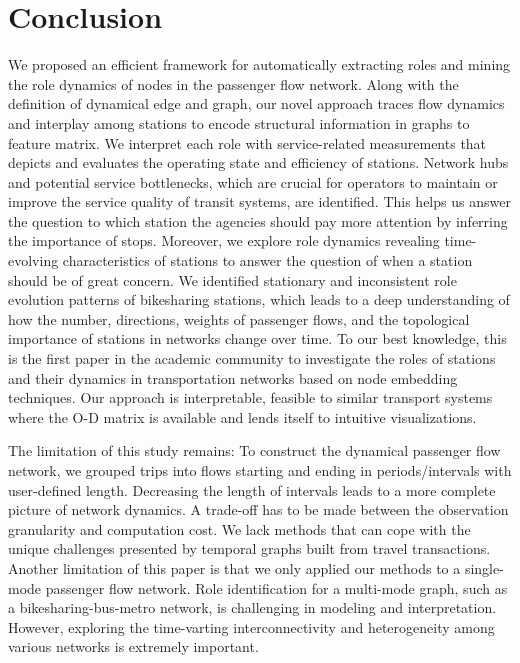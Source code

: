 \documentclass[a4paper,fleqn]{cas-sc}
\begin{document}
{\section{Conclusion}\label{conclusion}
We proposed an efficient framework for automatically extracting roles and mining the role dynamics of nodes in the passenger flow network. Along with the definition of dynamical edge and graph, our novel approach traces flow dynamics and interplay among stations to encode structural information in graphs to feature matrix. We interpret each role with service-related measurements that depicts and evaluates the operating state and efficiency of stations. Network hubs and potential service bottlenecks, which are crucial for operators to maintain or improve the service quality of transit systems, are identified. This helps us answer the question to which station the agencies should pay more attention by inferring the importance of stops. Moreover, we explore role dynamics revealing time-evolving characteristics of stations to answer the question of when a station should be of great concern. We identified stationary and inconsistent role evolution patterns of bikesharing stations, which leads to a deep understanding of how the number, directions, weights of passenger flows, and the topological importance of stations in networks change over time. To our best knowledge, this is the first paper in the academic community to investigate the roles of stations and their dynamics in transportation networks based on node embedding techniques. Our approach is interpretable, feasible to similar transport systems where the O-D matrix is available and lends itself to intuitive visualizations.

The limitation of this study remains: To construct the dynamical passenger flow network, we grouped trips into flows starting and ending in periods/intervals with user-defined length. Decreasing the length of intervals leads to a more complete picture of network dynamics. A trade-off has to be made between the observation granularity and computation cost. We lack methods that can cope with the unique challenges presented by temporal graphs built from travel transactions. Another limitation of this paper is that we only applied our methods to a single-mode passenger flow network. Role identification for a multi-mode graph, such as a bikesharing-bus-metro network, is challenging in modeling and interpretation. However, exploring the time-varting interconnectivity and heterogeneity among various networks is extremely important. 

}
\end{document}
